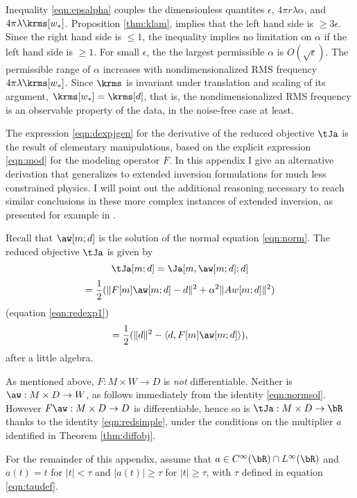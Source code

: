 Inequality \ref{eqn:epsalpha} couples the dimensionless quantites
$\epsilon$,  $4\pi r \lambda \alpha$, and $4 \pi \lambda
\krms[w_*]$. Proposition \ref{thm:klam}, implies that the left
hand side is $\ge 3\epsilon$. Since the right hand side is $\le 1$,
the inequality implies no limitation on $\alpha$ if the left hand side
is $\ge 1$. For small $\epsilon$, the the largest permissible $\alpha$
is $O(\sqrt{\epsilon})$. The permissible range of $\alpha$ increases with
nondimensionalized RMS frequency $4\pi \lambda \krms[w_*]$. Since
$\krms$ is invariant under translation and scaling of its argument,
$\krms[w_*]=\krms[d]$, that is, the nondimensionalized RMS frequency
is an observable property of the data, in the noise-free case at
least.

The expression \ref{eqn:dexpjgen} for the derivative of the reduced
objective $\tJa$ is the result of elementary manipulations, based on the
explicit expression \ref{eqn:mod} for the modeling operator $F$. In
this appendix I give an alternative derivation that generalizes to
extended inversion formulations for much less constrained physics. I
will point out the additional reasoning necessary to reach similar
conclusions in these more complex instances of extended inversion, as
presented for example in \cite{StolkSymes:03,StolkDeHoopSymes:09,Symes:IPTA14,tenKroode:IPTA14,HuangSymes:Geo17,HuangSymes:Geo18a,HuangSymes:Geo18b,HuangNammourSymesDollizal:SEG19}.

Recall that $\aw[m;d]$ is the solution of the normal equation
\ref{eqn:norm}. The reduced objective $\tJa$ is given by
\[
  \tJa[m;d] = \Ja[m,\aw[m;d];d]
\]
\[
  = \frac{1}{2}(\|F[m]\aw[m;d]-d\|^2 + \alpha^2\|Aw[m;d]\|^2)
\]
(equation \ref{eqn:redexp1})
\begin{equation}
  \label{eqn:redsimple}
  =\frac{1}{2}(\|d\|^2 - \langle d,F[m]\aw[m;d]\rangle),
\end{equation}
after a little algebra.

As mentioned above, $F:M \times W \rightarrow D$ is {\em not}
differentiable. Neither is $\aw: M \times D \rightarrow W$, as follows
immediately from the identity \ref{eqn:normsol}. However $F\aw: M
\times D \rightarrow D$ is differentiable, hence so is $\tJa: M \times
D \rightarrow \bR$ thanks
to the identity \ref{eqn:redsimple},
under the conditions on the multiplier $a$ identified in Theorem
\ref{thm:diffobj}.

For the remainder of this appendix, assume that
$a \in C^{\infty}(\bR)\cap L^{\infty}(\bR)$ and $a(t)=t$ for $|t|<\tau$ and $|a(t)| \ge
\tau$ for $|t| \ge \tau$, with $\tau$
defined in equation \ref{eqn:taudef}.

